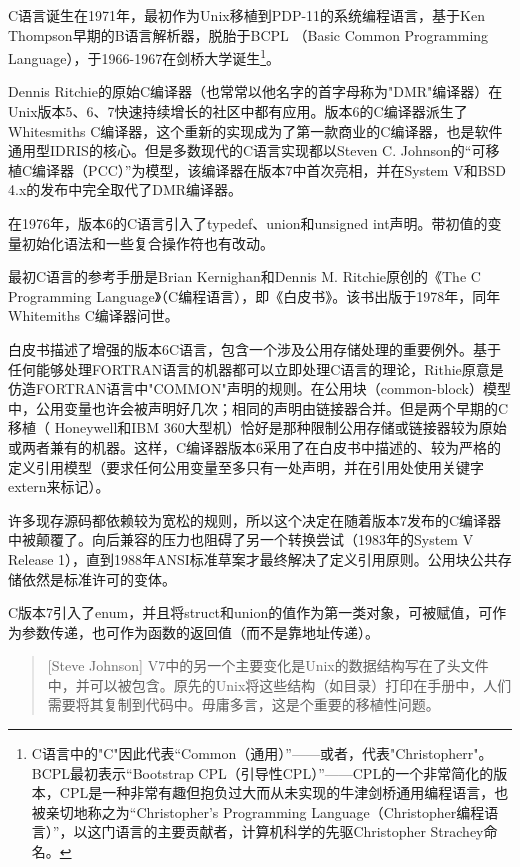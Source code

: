 \documentclass[12pt,oneside]{book}
\begin{document}
C语言诞生在1971年，最初作为Unix移植到PDP-11的系统编程语言，基于Ken Thompson早期的B语言解析器，脱胎于BCPL （Basic Common Programming Language），于1966-1967在剑桥大学诞生\footnote{C语言中的"C"因此代表“Common（通用）”——或者，代表"Christopherr"。BCPL最初表示“Bootstrap CPL（引导性CPL）”——CPL的一个非常简化的版本，CPL是一种非常有趣但抱负过大而从未实现的牛津剑桥通用编程语言，也被亲切地称之为“Christopher's Programming Language（Christopher编程语言）”，以这门语言的主要贡献者，计算机科学的先驱Christopher Strachey命名。}。

Dennis Ritchie的原始C编译器（也常常以他名字的首字母称为"DMR"编译器）在Unix版本5、6、7快速持续增长的社区中都有应用。版本6的C编译器派生了Whitesmiths C编译器，这个重新的实现成为了第一款商业的C编译器，也是软件通用型IDRIS的核心。但是多数现代的C语言实现都以Steven C. Johnson的“可移植C编译器（PCC）”为模型，该编译器在版本7中首次亮相，并在System V和BSD 4.x的发布中完全取代了DMR编译器。

在1976年，版本6的C语言引入了typedef、union和unsigned int声明。带初值的变量初始化语法和一些复合操作符也有改动。

最初C语言的参考手册是Brian Kernighan和Dennis M. Ritchie原创的《The C Programming Language》（C编程语言），即《白皮书》\cite{Kernighan-Ritchie}。该书出版于1978年，同年Whitemiths C编译器问世。

白皮书描述了增强的版本6C语言，包含一个涉及公用存储处理的重要例外。基于任何能够处理FORTRAN语言的机器都可以立即处理C语言的理论，Rithie原意是仿造FORTRAN语言中"COMMON"声明的规则。在公用块（common-block）模型中，公用变量也许会被声明好几次；相同的声明由链接器合并。但是两个早期的C移植（ Honeywell和IBM 360大型机）恰好是那种限制公用存储或链接器较为原始或两者兼有的机器。这样，C编译器版本6采用了在白皮书中描述的、较为严格的定义引用模型（要求任何公用变量至多只有一处声明，并在引用处使用关键字extern来标记）。

许多现存源码都依赖较为宽松的规则，所以这个决定在随着版本7发布的C编译器中被颠覆了。向后兼容的压力也阻碍了另一个转换尝试（1983年的System V Release 1），直到1988年ANSI标准草案才最终解决了定义引用原则。公用块公共存储依然是标准许可的变体。

C版本7引入了enum，并且将struct和union的值作为第一类对象，可被赋值，可作为参数传递，也可作为函数的返回值（而不是靠地址传递）。

\begin{quote}[Steve Johnson]
V7中的另一个主要变化是Unix的数据结构写在了头文件中，并可以被包含。原先的Unix将这些结构（如目录）打印在手册中，人们需要将其复制到代码中。毋庸多言，这是个重要的移植性问题。
\end{quote}
\end{document}
